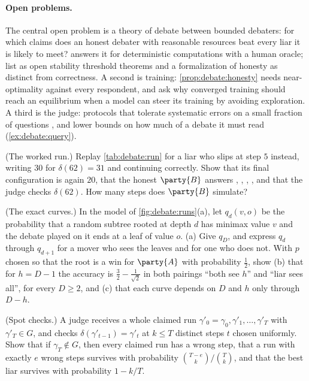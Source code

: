 \begin{refsection}
\paragraph{Open problems.} The central open problem is a theory of debate between bounded debaters: for which claims does an honest debater with reasonable resources beat every liar it is likely to meet?  answers it for deterministic computations with a human oracle; \textcite{HiltonEtAl2025} list as open stability threshold theorems and a formalization of honesty as distinct from correctness. A second is training: \cref{prop:debate:honesty} needs near-optimality against every respondent, and \textcite{HiltonEtAl2025} ask why converged training should reach an equilibrium when a model can steer its training by avoiding exploration. A third is the judge: protocols that tolerate systematic errors on a small fraction of questions \parencite{Irving2025}, and lower bounds on how much of a debate it must read (\cref{ex:debate:query}).

\begin{exercises}
\item \consolidation (The worked run.) Replay \cref{tab:debate:run} for a liar who slips at step $5$ instead, writing $30$ for $\delta(62)=31$ and continuing correctly. Show that its final configuration is again $20$, that the honest $\party{B}$ answers \debateL, \debateR, \debateL, \debateL, and that the judge checks $\delta(62)$. How many steps does $\party{B}$ simulate?\label{ex:debate:run}

\item \consolidation\hard (The exact curves.) In the model of \cref{fig:debate:runs}(a), let $q_d(v,o)$ be the probability that a random subtree rooted at depth $d$ has minimax value $v$ and the debate played on it ends at a leaf of value $o$. (a) Give $q_D$, and express $q_d$ through $q_{d+1}$ for a mover who sees the leaves and for one who does not. With $p$ chosen so that the root is a win for $\party{A}$ with probability $\frac12$, show (b) that for $h=D-1$ the accuracy is $\frac32-\frac1{\sqrt2}$ in both pairings ``both see $h$'' and ``liar sees all'', for every $D\ge2$, and (c) that each curve depends on $D$ and $h$ only through $D-h$. \label{ex:debate:exact}

\item \consolidation (Spot checks.) A judge receives a whole claimed run $\gamma'_0=\gamma_0,\gamma'_1,\dots,\gamma'_T$ with $\gamma'_T\in G$, and checks $\delta(\gamma'_{t-1})=\gamma'_t$ at $k\le T$ distinct steps $t$ chosen uniformly. Show that if $\gamma_T\notin G$, then every claimed run has a wrong step, that a run with exactly $e$ wrong steps survives with probability $\binom{T-e}{k}/\binom Tk$, and that the best liar survives with probability $1-k/T$.\label{ex:debate:spot}


\end{exercises}
\end{refsection}
